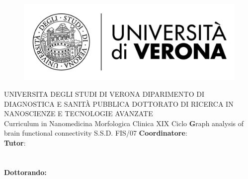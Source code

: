 
\begin{titlepage}
    \begin{figure}[!h]
    \flushleft
	\includegraphics[width=0.3\columnwidth]{images/univr.png}
	\end{figure}

    \begin{center}
    	\large
        UNIVERSITA DEGLI STUDI DI VERONA
        \hfill
        \vfill
		DIPARIMENTO DI DIAGNOSTICA E SANIT\`A PUBBLICA
		\vfill
		DOTTORATO DI RICERCA IN NANOSCIENZE E TECNOLOGIE AVANZATE\\Curriculum in Nanomedicina Morfologica Clinica
		\vfill
		XIX Ciclo
		\vfill
        \begingroup
       		\huge\textbf
            Graph analysis of brain functional connectivity
            \bigskip
        \endgroup
        \vfill
        S.S.D. FIS/07
		\flushleft 
		\normalsize{\textbf{Coordinatore}:}\\
		\flushleft
		\normalsize{\textbf{Tutor}:}\\
		\\
		\\
        \vfill  
        \flushright
        \normalsize{\textbf{Dottorando:}}\\
        \\	
		\vfill

    \end{center}  
\end{titlepage}

